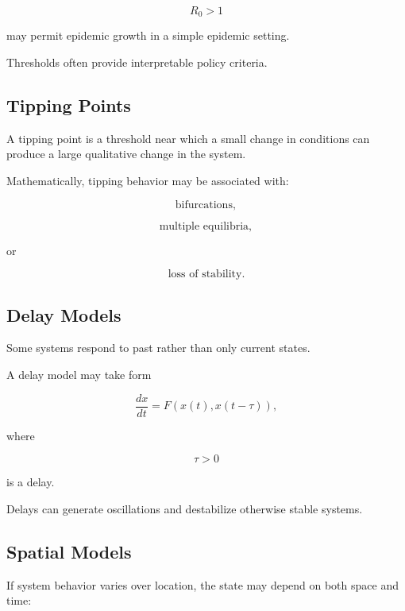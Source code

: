 \[
\boxed{
R_0>1
}
\]

may permit epidemic growth in a simple epidemic setting.

Thresholds often provide interpretable policy criteria.

\subsection{Tipping Points}
\label{subsec:model-tipping-points}

A tipping point is a threshold near which a small change in conditions can
produce a large qualitative change in the system.

Mathematically, tipping behavior may be associated with:

\[
\boxed{
\text{bifurcations},
}
\]

\[
\boxed{
\text{multiple equilibria},
}
\]

or

\[
\boxed{
\text{loss of stability}.
}
\]

\subsection{Delay Models}
\label{subsec:model-delay-effects}

Some systems respond to past rather than only current states.

A delay model may take form

\[
\boxed{
\frac{dx}{dt}
=
F
\left(
x(t),
x(t-\tau)
\right),
}
\]

where

\[
\tau>0
\]

is a delay.

Delays can generate oscillations and destabilize otherwise stable systems.

\subsection{Spatial Models}
\label{subsec:model-spatial-models}

If system behavior varies over location, the state may depend on both space
and time:

